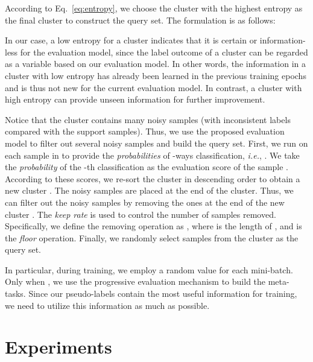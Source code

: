 \documentclass[runningheads]{llncs}
\begin{document}
According to Eq.~\ref{eq:entropy}, we choose the cluster  with the highest entropy as the final cluster to construct the query set. The formulation is as follows: 

In our case, a low entropy for a cluster indicates that it is certain or information-less for the evaluation model, since the label outcome of a cluster can be regarded as a variable based on our evaluation model. 
In other words, the information in a cluster with low entropy has already been learned in the previous training epochs and is thus not new for the current evaluation model. In contrast, a cluster with high entropy can provide unseen information for further improvement. 

Notice that the cluster  contains many noisy samples (with inconsistent labels compared with the support samples). Thus, we use the proposed evaluation model  to filter out several noisy samples and build the query set.
First, we run  on each sample  in   to provide the {\it probabilities}  of -ways classification, \emph{i.e.}, .
We take the {\it probability} of the -th classification  as the evaluation score of the sample . According to these scores, we re-sort the cluster  in descending order to obtain a new cluster . The noisy samples are placed at the end of the cluster. Thus, we can filter out the noisy samples by removing the ones at the end of the new cluster . The {\it keep rate}  is used to control the number of samples removed. Specifically, we define the removing operation as , where  is the length of , and  is the {\it floor} operation. Finally, we randomly select  samples from the cluster  as the query set. 

In particular, during training, we employ a random value  for each mini-batch. Only when , we use the progressive evaluation mechanism to build the meta-tasks. Since our pseudo-labels contain the most useful information for training, we need to utilize this information as much as possible. 












\section{Experiments}\label{sec:exp}
\end{document}
